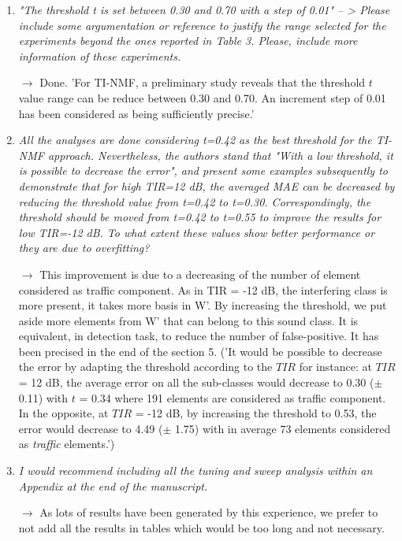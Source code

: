 \documentclass[10pt]{article}
\begin{document}
\begin{enumerate}
\item \emph{"The threshold t is set between 0.30 and 0.70 with a step of 0.01" -- > Please include some argumentation or reference to justify the range selected for the experiments beyond the ones reported in Table 3. Please, include more information of these experiments.}

$\rightarrow$ Done. 'For TI-NMF, a preliminary study reveals that the threshold $t$ value range can be reduce between  0.30 and 0.70. An increment step of 0.01 has been considered as being sufficiently precise.'

\item \emph{All the analyses are done considering t=0.42 as the best threshold for the TI-NMF approach. Nevertheless, the authors stand that "With a low threshold, it is possible to decrease the error", and present some examples subsequently to demonstrate that for high TIR=12 dB, the averaged MAE can be decreased by reducing the threshold value from t=0.42 to t=0.30. Correspondingly, the threshold should be moved from t=0.42 to t=0.55 to improve the results for low TIR=-12 dB. To what extent these values show better performance or they are due to overfitting?}

$\rightarrow$ This improvement is due to a decreasing of the number of element considered as traffic component. As in TIR = -12 dB, the interfering class is more present, it takes more basis in W'. By increasing the threshold, we put aside more elements from W' that can belong to this sound class. It is equivalent, in detection task, to reduce the number of false-positive. It has been precised in the end of the section 5. ('It would be possible to decrease the error by adapting the threshold according to the $TIR$ for instance: at $TIR$ = 12 dB, the average error on all the sub-classes would decrease to 0.30 ($\pm$ 0.11) with $t$ = 0.34 where 191 elements are considered as traffic component. In the opposite, at $TIR$ = -12 dB, by increasing the threshold to 0.53, the error would decrease to 4.49 ($\pm$ 1.75) with in average 73 elements considered as \textit{traffic} elements.')

\item \emph{I would recommend including all the tuning and sweep analysis within an Appendix at the end of the manuscript.}

$\rightarrow$ As lots of results have been generated by this experience, we prefer to not add all the results in tables which would be too long and not necessary.

\end{enumerate}
\end{document}

